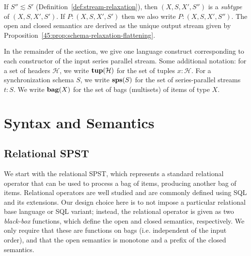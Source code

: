 \begin{definition}
\label{45:def:spst-subtyping}
If $S'' \lesssim S'$ (Definition~\ref{def:stream-relaxation}),
then $(X, S, X', S'')$ is a \emph{subtype} of $(X, S, X', S')$.
If $P: (X, S, X', S')$
then we also write $P: (X, S, X', S'')$.
The open and closed semantics are derived as the unique output stream
given by Proposition~\ref{45:prop:schema-relaxation-flattening}.

\end{definition}

\noindent
In the remainder of the section,
we give one language construct corresponding to each constructor of the input series parallel stream.
Some additional notation:
for a set of headers $\mathcal{H}$,
we write $\mathbf{tup}(\mathcal{H})$ for the set of tuples $x: \mathcal{H}$.
For a synchronization schema $S$,
we write $\mathbf{sps}(S)$ for the set of series-parallel streams $t: S$.
We write $\mathbf{bag}(X)$ for the set of bags (multisets) of items of type $X$.


\section{Syntax and Semantics}

\subsection{Relational SPST}

We start with the relational SPST, which represents a standard relational operator that can be used to process a bag of items, producing another bag of items.
Relational operators are well studied and are commonly defined using SQL
and its extensions.
Our design choice here is to not impose a particular relational base language
or SQL variant;
instead,
the relational operator is given as two \emph{black-box} functions,
which define the open and closed semantics,
respectively.
We only require that these are functions on bags (i.e. independent of the input order),
and that the open semantics is monotone and a prefix
of the closed semantics.

